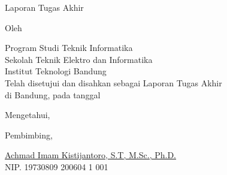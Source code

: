 \clearpage
\pagestyle{empty}

\begin{center}
  \smallskip

  \Large \bfseries \MakeUppercase{\thetitle}
  \vfill

  \Large Laporan Tugas Akhir
  \vfill

  \large Oleh

  \Large \theauthor

  \large Program Studi Teknik Informatika \\

  \normalsize \normalfont
  Sekolah Teknik Elektro dan Informatika \\
  Institut Teknologi Bandung \\

  \vfill
  \normalsize \normalfont
  Telah disetujui dan disahkan sebagai Laporan Tugas Akhir \\
  di Bandung, pada tanggal \tanggalpengesahan

  Mengetahui,

  Pembimbing,

  \vfill
  \underline{Achmad Imam Kistijantoro, S.T, M.Sc., Ph.D.
  } \\
  NIP. 19730809 200604 1 001

\end{center}
\clearpage
